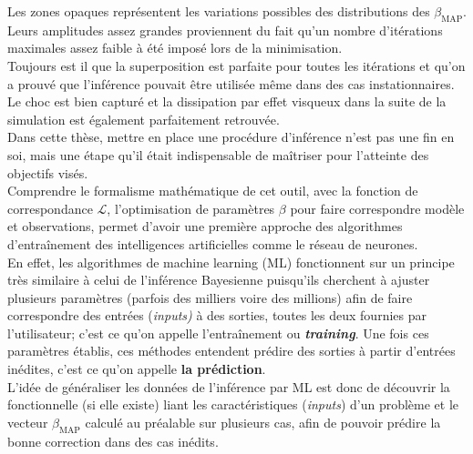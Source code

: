 \documentclass[a4paper,12pt]{article}
\newcommand{\bepar}[1]{
	\left( #1 \right)  
}
\newcommand{\bmap}{\beta_{\text{MAP}}}
\numberwithin{equation}{section} %
\begin{document}

Les zones opaques représentent les variations possibles des distributions des $\bmap$. Leurs amplitudes assez grandes proviennent du fait qu'un nombre d'itérations maximales assez faible à été imposé lors de la minimisation.\\ 
Toujours est il que la superposition est parfaite pour toutes les itérations et qu'on a prouvé que l'inférence pouvait être utilisée même dans des cas instationnaires.\\
Le choc est bien capturé et la dissipation par effet visqueux dans la suite de la simulation est également parfaitement retrouvée.\\

\noindent Dans cette thèse, mettre en place une procédure d'inférence n'est pas une fin en soi, mais une étape qu'il était indispensable de maîtriser pour l'atteinte des objectifs visés.\\
Comprendre le formalisme mathématique de cet outil, avec la fonction de correspondance $\mathcal{L}$, l'optimisation de paramètres $\beta$ pour faire correspondre modèle et observations, permet d'avoir une première approche des algorithmes d'entraînement des intelligences artificielles comme le réseau de neurones.\\
En effet, les algorithmes de machine learning (ML) fonctionnent sur un principe très similaire à celui de l'inférence Bayesienne puisqu'ils cherchent à ajuster plusieurs paramètres (parfois des milliers voire des millions) afin de faire correspondre des entrées (\textit{inputs)} à des sorties, toutes les deux fournies par l'utilisateur; c'est ce qu'on appelle l'entraînement ou \textbf{\textit{training}}. Une fois ces paramètres établis, ces méthodes entendent prédire des sorties à partir d'entrées inédites, c'est ce qu'on appelle \textbf{la prédiction}.\\

\noindent L'idée de généraliser les données de l'inférence par ML est donc de découvrir la fonctionnelle (si elle existe) liant les caractéristiques (\textit{inputs}) d'un problème et le vecteur $\bmap$ calculé au préalable sur plusieurs cas, afin de pouvoir prédire la bonne correction dans des cas inédits.
 
\end{document}
